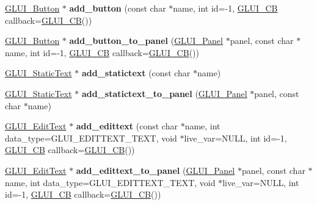 \begin{DoxyCompactItemize}
\item 
\hypertarget{class_g_l_u_i_a7a0e923887d735fd03756dadcec8a019}{\hyperlink{class_g_l_u_i___button}{G\+L\+U\+I\+\_\+\+Button} $\ast$ {\bfseries add\+\_\+button} (const char $\ast$name, int id=-\/1, \hyperlink{class_g_l_u_i___c_b}{G\+L\+U\+I\+\_\+\+C\+B} callback=\hyperlink{class_g_l_u_i___c_b}{G\+L\+U\+I\+\_\+\+C\+B}())}\label{class_g_l_u_i_a7a0e923887d735fd03756dadcec8a019}

\item 
\hypertarget{class_g_l_u_i_a086abe4cee5ba0f619d36f5aed8aac75}{\hyperlink{class_g_l_u_i___button}{G\+L\+U\+I\+\_\+\+Button} $\ast$ {\bfseries add\+\_\+button\+\_\+to\+\_\+panel} (\hyperlink{class_g_l_u_i___panel}{G\+L\+U\+I\+\_\+\+Panel} $\ast$panel, const char $\ast$name, int id=-\/1, \hyperlink{class_g_l_u_i___c_b}{G\+L\+U\+I\+\_\+\+C\+B} callback=\hyperlink{class_g_l_u_i___c_b}{G\+L\+U\+I\+\_\+\+C\+B}())}\label{class_g_l_u_i_a086abe4cee5ba0f619d36f5aed8aac75}

\item 
\hypertarget{class_g_l_u_i_ab12fd9cb4ff1fa696458bc28353a9dfa}{\hyperlink{class_g_l_u_i___static_text}{G\+L\+U\+I\+\_\+\+Static\+Text} $\ast$ {\bfseries add\+\_\+statictext} (const char $\ast$name)}\label{class_g_l_u_i_ab12fd9cb4ff1fa696458bc28353a9dfa}

\item 
\hypertarget{class_g_l_u_i_a1c08c219655f0046817985d12deccf1e}{\hyperlink{class_g_l_u_i___static_text}{G\+L\+U\+I\+\_\+\+Static\+Text} $\ast$ {\bfseries add\+\_\+statictext\+\_\+to\+\_\+panel} (\hyperlink{class_g_l_u_i___panel}{G\+L\+U\+I\+\_\+\+Panel} $\ast$panel, const char $\ast$name)}\label{class_g_l_u_i_a1c08c219655f0046817985d12deccf1e}

\item 
\hypertarget{class_g_l_u_i_a30485f08311b1d93e7e1b3668207bdd8}{\hyperlink{class_g_l_u_i___edit_text}{G\+L\+U\+I\+\_\+\+Edit\+Text} $\ast$ {\bfseries add\+\_\+edittext} (const char $\ast$name, int data\+\_\+type=G\+L\+U\+I\+\_\+\+E\+D\+I\+T\+T\+E\+X\+T\+\_\+\+T\+E\+X\+T, void $\ast$live\+\_\+var=N\+U\+L\+L, int id=-\/1, \hyperlink{class_g_l_u_i___c_b}{G\+L\+U\+I\+\_\+\+C\+B} callback=\hyperlink{class_g_l_u_i___c_b}{G\+L\+U\+I\+\_\+\+C\+B}())}\label{class_g_l_u_i_a30485f08311b1d93e7e1b3668207bdd8}

\item 
\hypertarget{class_g_l_u_i_a9f653ae354820e773d70d0d6941991ae}{\hyperlink{class_g_l_u_i___edit_text}{G\+L\+U\+I\+\_\+\+Edit\+Text} $\ast$ {\bfseries add\+\_\+edittext\+\_\+to\+\_\+panel} (\hyperlink{class_g_l_u_i___panel}{G\+L\+U\+I\+\_\+\+Panel} $\ast$panel, const char $\ast$name, int data\+\_\+type=G\+L\+U\+I\+\_\+\+E\+D\+I\+T\+T\+E\+X\+T\+\_\+\+T\+E\+X\+T, void $\ast$live\+\_\+var=N\+U\+L\+L, int id=-\/1, \hyperlink{class_g_l_u_i___c_b}{G\+L\+U\+I\+\_\+\+C\+B} callback=\hyperlink{class_g_l_u_i___c_b}{G\+L\+U\+I\+\_\+\+C\+B}())}\label{class_g_l_u_i_a9f653ae354820e773d70d0d6941991ae}


\end{DoxyCompactItemize}
